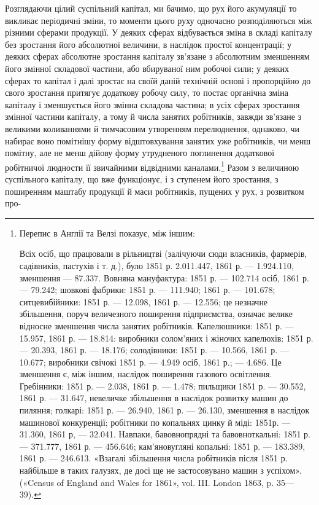 Розглядаючи цілий суспільний капітал, ми бачимо, що рух
його акумуляції то викликає періодичні зміни, то моменти цього
руху одночасно розподіляються між різними сферами продукції.
У деяких сферах відбувається зміна в складі капіталу без зростання
його абсолютної величини, в наслідок простої концентрації;
у деяких сферах абсолютне зростання капіталу зв’язане з абсолютним
зменшенням його змінної складової частини, або вбируваної
ним робочої сили; у деяких сферах то капітал і далі зростає
на своїй даній технічній основі і пропорційно до свого зростання
притягує додаткову робочу силу, то постає органічна зміна капіталу
і зменшується його змінна складова частина; в усіх сферах
зростання змінної частини капіталу, а тому й числа занятих
робітників, завжди зв’язане з великими коливаннями й тимчасовим
утворенням перелюднення, однаково, чи набирає воно
помітнішу форму відштовхування занятих уже робітників, чи
менш помітну, але не менш дійову форму утрудненого поглинення
додаткової робітничої людности її звичайними відвідними каналами.\footnote{
Перепис в Англії та Велзі показує, між іншим:

Всіх осіб, що працювали в рільництві (залічуючи сюди власників,
фармерів, садівників, пастухів і т. д.), було 1851 р. 2.011.447, 1861 р. —
1.924.110, зменшення — 87.337. Вовняна мануфактура: 1851 р. — 102.714
осіб, 1861 р. — 79.242; шовкові фабрики: 1851 р. — 111.940; 1861 р. —
101.678; ситцевибійники: 1851 р. — 12.098, 1861 р. — 12.556; це незначне
збільшення, поруч величезного поширення підприємства, означає
велике відносне зменшення числа занятих робітників. Капелюшники:
1851 р. — 15.957, 1861 р. — 18.814: виробники солом’яних і жіночих капелюхів:
1851 р. — 20.393, 1861 р. — 18.176; солодівники: 1851 р. —
10.566, 1861 р. — 10.677; виробники свічокі 1851 р. — 4.949 осіб, 1861 р.; —
4.686. Це зменшення є, між іншим, наслідок поширення газового освітлення.
Гребінники: 1851 р. — 2.038, 1861 р. — 1.478; пильщики 1851 р. —
30.552, 1861 р. — 31.647, невеличке збільшення в наслідок розвитку
машин до пиляння; голкарі: 1851 р. — 26.940, 1861 р. — 26.130, зменшення
в наслідок машинової конкуренції; робітники по копальнях цинку й
міді: 1851р. — 31.360, 1861 р, — 32.041. Навпаки, бавовнопрядні та бавовноткальні:
1851 р. — 371.777, 1861 р. — 456.646; кам’яновугляні копальні:
1851 р. — 183.389, 1861 р. — 246.613. «Взагалі збільшення числа робітників
після 1851 р. найбільше в таких галузях, де досі ще не застосовувано
машин з успіхом». («Census of England and Wales for 1861», vol. III.
London 1863, p. 35—39).
}
Разом з величиною суспільного капіталу, що вже функціонує,
і з ступенем його зростання, з поширенням маштабу
продукції й маси робітників, пущених у рух, з розвитком про-
\parbreak{}  %
